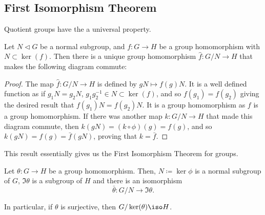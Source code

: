 \documentclass[12pt]{report}
\begin{document}
\subsection{First Isomorphism Theorem}\label{sec:group-theory:first-isom-theorem}

Quotient groups have the a universal property.

\begin{theorem}\label{thm:group-theory:universal-property-of-quotient-groups}
  Let \(N \triangleleft G\) be a normal subgroup, and \(f : G \to H\) be a group homomorphism with \(N \subset \ker(f)\).
  Then there is a unique group homomorphism \(\hat f : G/N \to H\) that makes the following diagram commute:
  \begin{center}
  \end{center}
\end{theorem}

\begin{proof}
  The map \(\hat f: G/N \to H\) is defined by \(gN \mapsto f(g)N\).
  It is a well defined function as if \(g_{1}N = g_{2}N\), \(g_{1}g^{-1}_{2} \in N \subset \ker(f)\), and so \(f(g_{1})=f(g_{2})\) giving the desired result that \(f(g_{1})N = f(g_{2})N\).
  It is a group homomorphism as \(f\) is a group homomorphism.
  If there was another map \(k:G/N \to H\) that made this diagram commute, then \(k(gN) = (k \circ \phi)(g) = f(g)\), and so \(k(gN) = f(g) = \bar f (gN)\), proving that \(k = \bar f\).
\end{proof}

This result essentially gives us the First Isomorphism Theorem for groups.

\begin{theorem}
  \label{thm:group-theory:first-isomorphism-theorem}
  Let \(\theta : G \to H\) be a group homomorphism.
  Then, \(N \coloneqq \ker\phi\) is a normal subgroup of \(G\), \(\Im \theta\) is a subgroup of \(H\) and there is an isomorphism
  \[\bar \theta : G / N \to \Im \theta.\]

  In particular, if \(\theta\) is surjective, then \(G / \ker(\theta) \iso H\).
\end{theorem}
\end{document}
